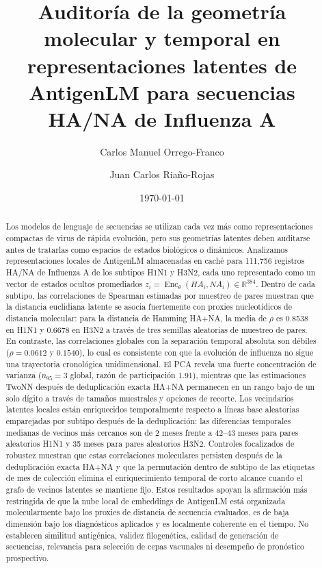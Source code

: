 \documentclass[11pt]{article}
\title{Auditoría de la geometría molecular y temporal en representaciones latentes de AntigenLM para secuencias HA/NA de Influenza A}
\author{
Carlos Manuel Orrego-Franco
\and
Juan Carlos Riaño-Rojas
}
\date{\today}
\newcommand{\Enc}{\operatorname{Enc}}
\newcommand{\R}{\mathbb{R}}
\begin{document}
\maketitle

\begin{abstract}
Los modelos de lenguaje de secuencias se utilizan cada vez más como representaciones compactas de virus de rápida evolución, pero sus geometrías latentes deben auditarse antes de tratarlas como espacios de estados biológicos o dinámicos. Analizamos representaciones locales de AntigenLM almacenadas en caché para 111,756 registros HA/NA de Influenza A de los subtipos H1N1 y H3N2, cada uno representado como un vector de estados ocultos promediados $z_i=\Enc_{\theta}(HA_i,NA_i)\in\R^{384}$. Dentro de cada subtipo, las correlaciones de Spearman estimadas por muestreo de pares muestran que la distancia euclidiana latente se asocia fuertemente con proxies nucleotídicos de distancia molecular: para la distancia de Hamming HA+NA, la media de $\rho$ es 0.8538 en H1N1 y 0.6678 en H3N2 a través de tres semillas aleatorias de muestreo de pares. En contraste, las correlaciones globales con la separación temporal absoluta son débiles ($\rho=0.0612$ y $0.1540$), lo cual es consistente con que la evolución de influenza no sigue una trayectoria cronológica unidimensional. El PCA revela una fuerte concentración de varianza ($n_{95}=3$ global, razón de participación 1.91), mientras que las estimaciones TwoNN después de deduplicación exacta HA+NA permanecen en un rango bajo de un solo dígito a través de tamaños muestrales y opciones de recorte. Los vecindarios latentes locales están enriquecidos temporalmente respecto a líneas base aleatorias emparejadas por subtipo después de la deduplicación: las diferencias temporales medianas de vecinos más cercanos son de 2 meses frente a 42--43 meses para pares aleatorios H1N1 y 35 meses para pares aleatorios H3N2. Controles focalizados de robustez muestran que estas correlaciones moleculares persisten después de la deduplicación exacta HA+NA y que la permutación dentro de subtipo de las etiquetas de mes de colección elimina el enriquecimiento temporal de corto alcance cuando el grafo de vecinos latentes se mantiene fijo. Estos resultados apoyan la afirmación más restringida de que la nube local de embeddings de AntigenLM está organizada molecularmente bajo los proxies de distancia de secuencia evaluados, es de baja dimensión bajo los diagnósticos aplicados y es localmente coherente en el tiempo. No establecen similitud antigénica, validez filogenética, calidad de generación de secuencias, relevancia para selección de cepas vacunales ni desempeño de pronóstico prospectivo.
\end{abstract}
\end{document}
